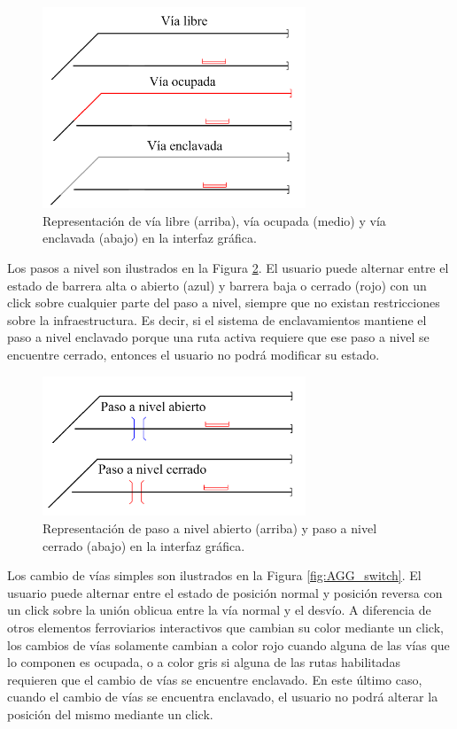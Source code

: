 	\begin{figure}[H]
		\centering
		\includegraphics[width=0.7\textwidth]{AGG/images/AGG_via}
		\centering\caption{Representación de vía libre (arriba), vía ocupada (medio) y vía enclavada (abajo) en la interfaz gráfica.}
		\label{fig:AGG_tracks}
	\end{figure}
	
	Los pasos a nivel son ilustrados en la Figura \ref{fig:AGG_levelCrossing}. El usuario puede alternar entre el estado de barrera alta o abierto (azul) y barrera baja o cerrado (rojo) con un click sobre cualquier parte del paso a nivel, siempre que no existan restricciones sobre la infraestructura. Es decir, si el sistema de enclavamientos mantiene el paso a nivel enclavado porque una ruta activa requiere que ese paso a nivel se encuentre cerrado, entonces el usuario no podrá modificar su estado.
	
	\begin{figure}[H]
		\centering
		\includegraphics[width=0.7\textwidth]{AGG/images/AGG_cruce}
		\centering\caption{Representación de paso a nivel abierto (arriba) y paso a nivel cerrado (abajo) en la interfaz gráfica.}
		\label{fig:AGG_levelCrossing}
	\end{figure}
	
	Los cambio de vías simples son ilustrados en la Figura \ref{fig:AGG_switch}. El usuario puede alternar entre el estado de posición normal y posición reversa con un click sobre la unión oblicua entre la vía normal y el desvío. A diferencia de otros elementos ferroviarios interactivos que cambian su color mediante un click, los cambios de vías solamente cambian a color rojo cuando alguna de las vías que lo componen es ocupada, o a color gris si alguna de las rutas habilitadas requieren que el cambio de vías se encuentre enclavado. En este último caso, cuando el cambio de vías se encuentra enclavado, el usuario no podrá alterar la posición del mismo mediante un click.
	
